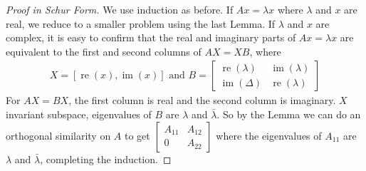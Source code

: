 \documentclass[11pt]{article}
\numberwithin{equation}{section}
\begin{document}
\begin{proof}[Proof in Schur Form]
    We use induction as before. If $A x=\lambda x$ where $\lambda$ and $x$ are real, we reduce to a smaller problem using the last Lemma.
    If $\lambda$ and $x$ are complex, it is easy to confirm that the real and imaginary parts of $A x=\lambda x$ are equivalent to the first and second columns of $AX = XB$, 
    where \begin{align*}
        X = [\operatorname{re}(x), \operatorname{im}(x)] \text{ and } B=\left[\begin{array}{cc}
            \operatorname{re}(\lambda) & \operatorname{im} (\lambda) \\
            \operatorname{im}(\Delta) & \operatorname{re}(\lambda)
            \end{array}\right]
    \end{align*}
    For $AX=BX$, the first column is real and the second column is imaginary. $X$ invariant subspace, eigenvalues of $B$ are $\lambda$ and $\bar{\lambda}$.
    So by the Lemma we can do an orthogonal similarity on $A$ to get $\left[\begin{array}{ll}
        A_{11} & A_{12} \\
        0 & A_{22}
        \end{array}\right]$
   where the eigenvalues of $A_{11}$ are $\lambda$ and $\bar{\lambda}$, completing the induction.
\end{proof}
\end{document}
